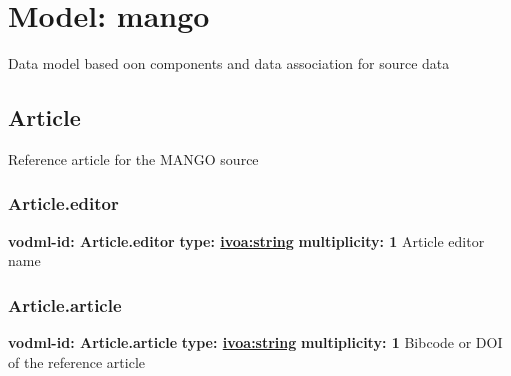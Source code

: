 
%











\pagebreak
\section{Model: mango }


  Data model based oon components and data association for source data

  \subsection{Article}
  \label{sect:Article}
    Reference article for the MANGO source

    \subsubsection{Article.editor}
      \textbf{vodml-id: Article.editor} \newline
      \textbf{type: \hyperref[sect:ivoa]{ivoa:string}} \newline
      \textbf{multiplicity: 1} \newline
      Article editor name

    \subsubsection{Article.article}
      \textbf{vodml-id: Article.article} \newline
      \textbf{type: \hyperref[sect:ivoa]{ivoa:string}} \newline
      \textbf{multiplicity: 1} \newline
      Bibcode or DOI of the reference article

